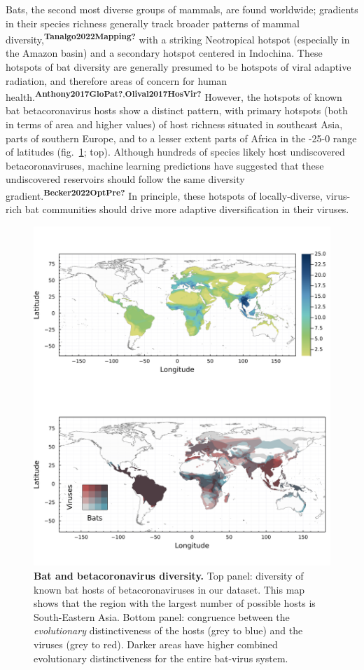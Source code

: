 \documentclass[10pt,oneside]{article}
\makeatletter
\def\maxwidth{\ifdim\Gin@nat@width>\linewidth\linewidth
\else\Gin@nat@width\fi}
\let\Oldincludegraphics\includegraphics
\renewcommand{\includegraphics}[1]{\Oldincludegraphics[width=\maxwidth]{#1}}
\makeatother
\begin{document}
Bats, the second most diverse groups of mammals, are found worldwide;
gradients in their species richness generally track broader patterns of
mammal diversity,\textsuperscript{\textbf{Tanalgo2022Mapping?}} with a
striking Neotropical hotspot (especially in the Amazon basin) and a
secondary hotspot centered in Indochina. These hotspots of bat diversity
are generally presumed to be hotspots of viral adaptive radiation, and
therefore areas of concern for human
health.\textsuperscript{\textbf{Anthony2017GloPat?},\textbf{Olival2017HosVir?}}
However, the hotspots of known bat betacoronavirus hosts show a distinct
pattern, with primary hotspots (both in terms of area and higher values)
of host richness situated in southeast Asia, parts of southern Europe,
and to a lesser extent parts of Africa in the -25-0 range of latitudes
(fig.~\ref{fig:richness}; top). Although hundreds of species likely host
undiscovered betacoronaviruses, machine learning predictions have
suggested that these undiscovered reservoirs should follow the same
diversity gradient.\textsuperscript{\textbf{Becker2022OptPre?}} In
principle, these hotspots of locally-diverse, virus-rich bat communities
should drive more adaptive diversification in their viruses.

\begin{figure}
\hypertarget{fig:richness}{%
\centering
\includegraphics{figures/combined_richness.png}
\caption{\textbf{Bat and betacoronavirus diversity.} Top panel:
diversity of known bat hosts of betacoronaviruses in our dataset. This
map shows that the region with the largest number of possible hosts is
South-Eastern Asia. Bottom panel: congruence between the
\emph{evolutionary} distinctiveness of the hosts (grey to blue) and the
viruses (grey to red). Darker areas have higher combined evolutionary
distinctiveness for the entire bat-virus system.}\label{fig:richness}
}
\end{figure}
\end{document}
